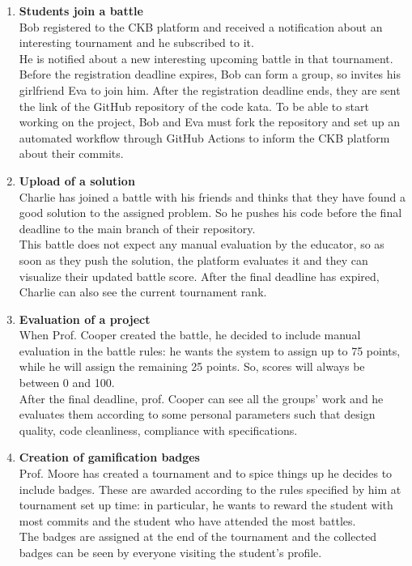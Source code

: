 \begin{enumerate}
    \item \textbf{Students join a battle} \\
    Bob registered to the CKB platform and received a notification about an interesting tournament 
    and he subscribed to it. \\
    He is notified about a new interesting upcoming battle in that tournament. Before the registration 
    deadline expires, Bob can form a group, so invites his girlfriend Eva to join him. After the registration 
    deadline ends, they are sent the link of the GitHub repository of the code kata. To be able to start 
    working on the project, Bob and Eva must fork the repository and set up an automated workflow through 
    GitHub Actions to inform the CKB platform about their commits.

    \item \textbf{Upload of a solution} \\
    Charlie has joined a battle with his friends and thinks that they have found a good solution to 
    the assigned problem. So he pushes his code before the final deadline to the main branch of their 
    repository. \\This battle does not expect any manual evaluation by the educator, so as soon as 
    they push the solution, the platform evaluates it and they can visualize their updated battle score. 
    After the final deadline has expired, Charlie can also see the current tournament rank. 

    \item \textbf{Evaluation of a project}\\
    When Prof. Cooper created the battle, he decided to include manual evaluation in the battle rules: 
    he wants the system to assign up to 75 points, while he will assign the remaining 25 points. 
    So, scores will always be between 0 and 100.\\
    After the final deadline, prof. Cooper can see all the groups' work and he evaluates them according 
    to some personal parameters such that design quality, code cleanliness, compliance with specifications.

    \item \textbf{Creation of gamification badges}\\
    Prof. Moore has created a tournament and to spice things up he decides to include badges. 
    These are awarded according to the rules specified by him at tournament set up time: in particular, 
    he wants to reward the student with most commits and the student who have attended the most battles.\\
    The badges are assigned at the end of the tournament and the collected badges can be seen by everyone 
    visiting the student's profile. \\
\end{enumerate}

